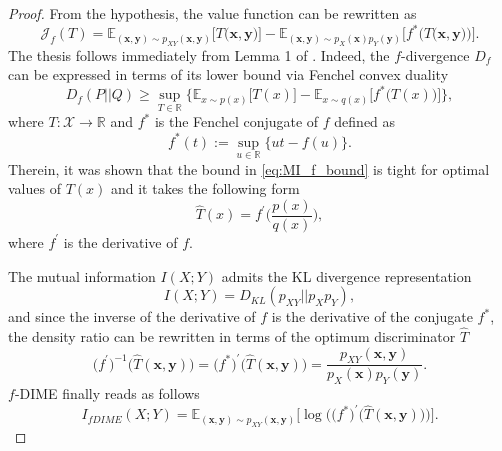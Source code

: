 \begin{proof} 
From the hypothesis, the value function can be rewritten as
\begin{equation}
\mathcal{J}_{f}(T) =  \mathbb{E}_{(\mathbf{x},\mathbf{y}) \sim p_{XY}(\mathbf{x},\mathbf{y})}\biggl[T\bigl(\mathbf{x},\mathbf{y}\bigr)\biggr]  -\mathbb{E}_{(\mathbf{x},\mathbf{y}) \sim p_{X}(\mathbf{x})p_{Y}(\mathbf{y})}\biggl[f^*\biggl(T\bigl(\mathbf{x},\mathbf{y}\bigr)\biggr)\biggr].
\end{equation}
The thesis follows immediately from Lemma 1 of \cite{Nguyen2010}. Indeed, the $f$-divergence $D_f$ can be expressed in terms of its lower bound via Fenchel convex duality
\begin{equation}
\label{eq:MI_f_bound}
D_f(P||Q) \geq \sup_{T\in \mathbb{R}} \biggl\{ \mathbb{E}_{x \sim p(x)} \bigl[T(x)\bigr]-\mathbb{E}_{x\sim q(x)}\bigl[f^*\bigl(T(x)\bigr)\bigr]\biggr\},
\end{equation}
where $T: \mathcal{X} \to \mathbb{R}$ and $f^*$ is the Fenchel conjugate of $f$ defined as
\begin{equation}
f^*(t) := \sup_{u\in \mathbb{R}} \{ ut -f(u)\}.
\end{equation}
Therein, it was shown that the bound in \eqref{eq:MI_f_bound} is tight for optimal values of $T(x)$ and it takes the following form
\begin{equation}
\hat{T}(x) = f^{\prime} \biggl(\frac{p(x)}{q(x)}\biggr),
\end{equation}
where $f^{\prime}$ is the derivative of $f$.

The mutual information $I(X;Y)$ admits the KL divergence representation 
\begin{equation}
I(X;Y) = D_{KL}(p_{XY}||p_X p_Y),
\end{equation}
and since the inverse of the derivative of $f$ is the derivative of the conjugate $f^*$, the density ratio can be rewritten in terms of the optimum discriminator $\hat{T}$
\begin{equation}
\bigl(f^{\prime}\bigr)^{-1}\bigl(\hat{T}(\mathbf{x},\mathbf{y})\bigr) = \bigl(f^*\bigr)^{\prime}\bigl(\hat{T}(\mathbf{x},\mathbf{y})\bigr) = \frac{p_{XY}(\mathbf{x},\mathbf{y})}{p_X(\mathbf{x})p_Y(\mathbf{y})}.
\end{equation}
$f$-DIME finally reads as follows
\begin{equation}
I_{fDIME}(X;Y) = \mathbb{E}_{(\mathbf{x},\mathbf{y}) \sim p_{XY}(\mathbf{x},\mathbf{y})}\biggl[ \log \biggl(\bigl(f^*\bigr)^{\prime}\bigl(\hat{T}(\mathbf{x},\mathbf{y})\bigr) \biggr) \biggr].
\end{equation}
\end{proof}


